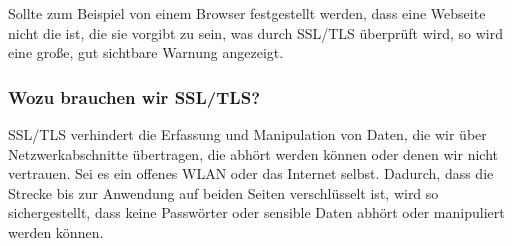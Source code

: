 Sollte zum Beispiel von einem Browser festgestellt werden, dass eine Webseite 
nicht die ist, die sie vorgibt zu sein, was durch SSL/TLS überprüft wird, so 
wird eine große, gut sichtbare Warnung angezeigt.

\subsubsection{Wozu brauchen wir SSL/TLS?}
SSL/TLS verhindert die Erfassung und Manipulation von Daten, die wir über 
Netzwerkabschnitte übertragen, die abhört werden können oder denen wir nicht 
vertrauen. Sei es ein offenes WLAN oder das Internet selbst. Dadurch, dass die 
Strecke bis zur Anwendung auf beiden Seiten verschlüsselt ist, wird so 
sichergestellt, dass keine Passwörter oder sensible Daten abhört oder 
manipuliert werden können.

